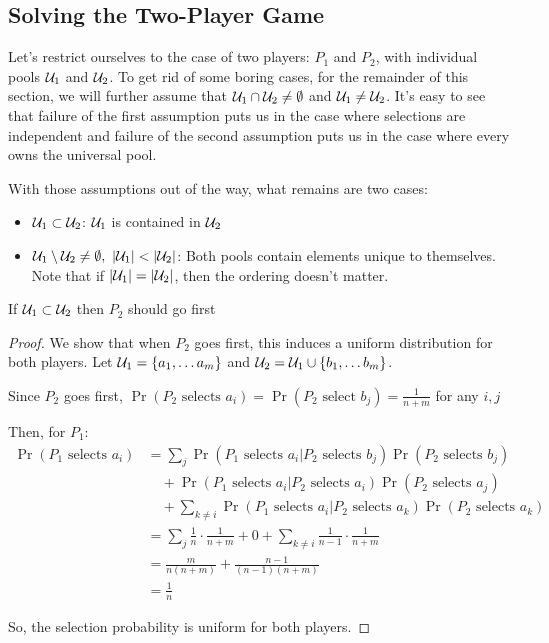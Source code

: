 \subsection{Solving the Two-Player Game}\label{Section:Two-Player}
Let's restrict ourselves to the case of two players: $P_1$ and $P_2$, with individual pools $\mathcal{U}_1$ and $\mathcal{U}_2$.
To get rid of some boring cases, for the remainder of this section, we will further assume that $\mathcal{U}_1 \cap \mathcal{U}_2 \neq \emptyset$ and $\mathcal{U}_1 \neq \mathcal{U}_2$.
It's easy to see that failure of the first assumption puts us in the case where selections are independent and failure of the second assumption puts us in the case where every owns the universal pool.

With those assumptions out of the way, what remains are two cases:
\begin{itemize}
    \item $\mathcal{U}_1 \subset \mathcal{U}_2$: $\mathcal{U}_1$ is contained in $\mathcal{U}_2$
    \item $\U_1 \setminus \U_2 \neq \emptyset,\ |\U_1| < |\U_2|$: Both pools contain elements unique to themselves. Note that if $|\mathcal{U}_1| = |\mathcal{U}_2|$, then the ordering doesn't matter. 
\end{itemize}

\begin{proposition}
    If $\mathcal{U}_1 \subset \mathcal{U}_2$ then $P_2$ should go first
\end{proposition}
\begin{proof}
    We show that when $P_2$ goes first, this induces a uniform distribution for both players.
    Let $\mathcal{U}_1 = \{a_1, \ldots a_m\}$ and $\mathcal{U}_2 = \mathcal{U}_1 \cup \{b_1, \ldots b_m\}$.
    
    Since $P_2$ goes first, $\Pr(P_2 \text{ selects } a_i) = \Pr(P_2 \text{ select } b_j) = \frac{1}{n + m}$ for any $i, j$

    Then, for $P_1$:
    \begin{align*}
        \Pr(P_1 \text{ selects } a_i) 
        &= \sum_j \Pr(P_1 \text{ selects } a_i \vert P_2 \text{ selects } b_j)\Pr(P_2 \text{ selects } b_j) \\
        &\quad + \Pr(P_1 \text{ selects } a_i \vert P_2 \text{ selects } a_i)\Pr(P_2 \text{ selects } a_j) \\
        &\quad + \sum_{k \neq i} \Pr(P_1 \text{ selects } a_i \vert P_2 \text{ selects } a_k)\Pr(P_2 \text{ selects } a_k) \\\
        &= \sum_j \frac{1}{n}\cdot\frac{1}{n + m} + 0 + \sum_{k \neq i}\frac{1}{n-1}\cdot\frac{1}{n + m} \\
        &= \frac{m}{n(n + m)} + \frac{n - 1}{(n-1)(n+m)} \\
        &= \frac{1}{n} 
    \end{align*}

    So, the selection probability is uniform for both players.
\end{proof}

